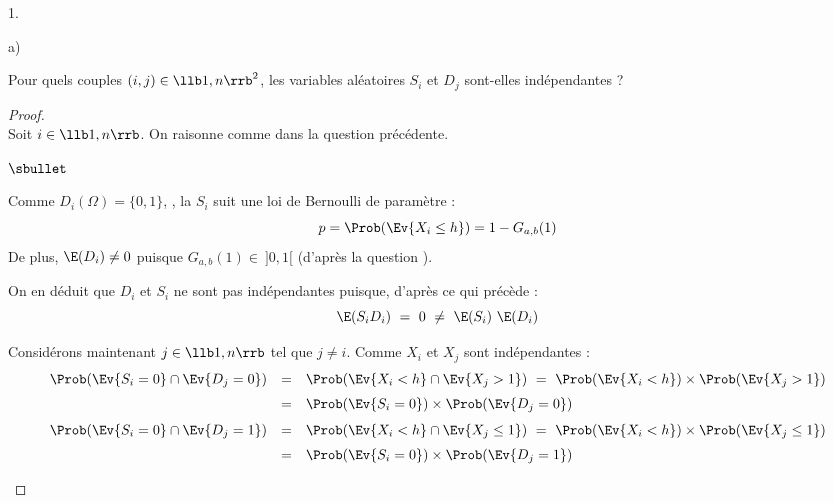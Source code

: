\documentclass[11pt]{article}%
\begin{document}
\begin{noliste}{1.}
\begin{noliste}{a)}
  \item Pour quels couples $(i,j) \in \llb 1,n\rrb^2$, les variables
    aléatoires $S_i$ et $D_j$ sont-elles indépendantes ?

    \begin{proof}~\\
      Soit $i \in \llb 1,n\rrb$. On raisonne comme dans la question
      précédente.
      \begin{noliste}{$\sbullet$}
      \item Comme $D_i(\Omega) = \{0, 1\}$, , la \var $S_i$ suit une loi
      de Bernoulli de paramètre : 
      \[
	p= \Prob(\Ev{X_i \leq h}) = 1-G_{a,b}(1)
      \]
        De plus, $\E(D_i) \neq 0$ puisque $G_{a, b}(1) \in \ ]0,1[$
        (d'après la question ).

      \item On en déduit que $D_i$ et $S_i$ ne sont pas indépendantes
        puisque, d'après ce qui précède :
        \[
        \E(S_i D_i) \ = \ 0 \ \neq \ \E(S_i) \ \E(D_i)
        \]

      \item Considérons maintenant $j \in \llb 1, n\rrb$ tel que $j
        \neq i$. Comme $X_i$ et $X_j$ sont indépendantes :
        \[
        \begin{array}{rcl}
          \Prob(\Ev{S_i = 0} \cap \Ev{D_j = 0}) & = & \Prob(\Ev{X_i < h}
          \cap \Ev{X_j > 1}) \ = \ \Prob(\Ev{X_i < h}) \times 
	  \Prob(\Ev{X_j > 1}) 
	  \\[.2cm]
	  &=& \Prob(\Ev{S_i=0}) \times \Prob(\Ev{D_j=0})
        \end{array}
        \]
        \[
          \begin{array}{rcl}
            \Prob(\Ev{S_i = 0} \cap \Ev{D_j = 1}) & = & \Prob(\Ev{X_i < 
	    h} \cap \Ev{X_j \leq 1}) \ = \ \Prob(\Ev{X_i < h}) \times
           \Prob(\Ev{X_j \leq 1}) 
           \\[.2cm]
           &=& \Prob(\Ev{S_i=0}) \times \Prob(\Ev{D_j=1})
          \end{array}
        \]
        

\end{noliste}
\end{proof}
\end{noliste}
\end{noliste}
\end{document}
